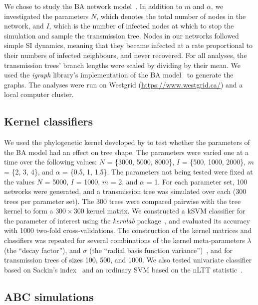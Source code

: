 \documentclass[12pt]{article}\usepackage[]{graphicx}\usepackage[]{color}
\newcommand{\software}[1]{\textit{#1}}
\newcommand{\sett}[1]{\{#1\}}
\begin{document}
We chose to study the \gls{BA} network model~\autocite{barabasi1999emergence}.
In addition to $m$ and $\alpha$, we investigated the parameters $N$, which
denotes the total number of nodes in the network, and $I$, which is the number
of infected nodes at which to stop the simulation and sample the transmission
tree. Nodes in our networks followed simple \gls{SI} dynamics, meaning that
they became infected at a rate proportional to their numbers of infected
neighbours, and never recovered. For all analyses, the transmission trees'
branch lengths were scaled by dividing by their mean. We used the 
\software{igraph} library's implementation of the \gls{BA}
model~\autocite{csardi2006igraph} to generate the graphs. The analyses were run
on Westgrid (\url{https://www.westgrid.ca/}) and a local computer cluster.

\subsection*{Kernel classifiers}

We used the phylogenetic kernel developed by \textcite{poon2013mapping} to test
whether the parameters of the \gls{BA} model had an effect on tree shape. The
parameters were varied one at a time over the following values: $N$ =
\sett{3000, 5000, 8000}, $I$ = \sett{500, 1000, 2000}, $m$ = \sett{2, 3, 4},
and $\alpha$ = \sett{0.5, 1, 1.5}. The parameters not being tested were fixed
at the values $N$ = 5000, $I$ = 1000, $m$ = 2, and $\alpha$ = 1. For each
parameter set, 100 networks were generated, and a transmission tree was
simulated over each (300 trees per parameter set). The 300 trees were compared
pairwise with the tree kernel to form a $300 \times 300$ kernel matrix. We
constructed a \gls{kSVM} classifier for the parameter of interest using the
\software{kernlab} package~\autocite{karatzoglou2004kernlab}, and evaluated its
accuracy with 1000 two-fold cross-validations. The construction of the kernel
matrices and classifiers was repeated for several combinations of the kernel
meta-parameters $\lambda$ (the ``decay factor''), and $\sigma$ (the ``radial
basis function variance'')~\autocite[see][]{poon2013mapping}, and for
transmission trees of sizes 100, 500, and 1000. We also tested univariate
classifier based on Sackin's index~\autocite{shao1990tree} and an ordinary SVM
based on the \gls{nLTT} statistic~\autocite{janzen2015approximate}.

\subsection*{ABC simulations}
\end{document}
